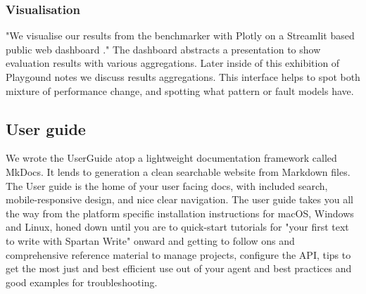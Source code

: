 \subsubsection{Visualisation}
"We visualise our results from the benchmarker with Plotly \cite{plotly} on a Streamlit based public web dashboard \cite{streamlit}."
The dashboard abstracts a presentation to show evaluation results with various aggregations.
Later inside of this exhibition of Playgound notes we discuss results aggregations.
This interface helps to spot both mixture of performance change, and spotting what pattern or fault models have.

\subsection{User guide}
We wrote the UserGuide atop a lightweight documentation framework called MkDocs.
It lends to generation a clean searchable website from Markdown files.
The User guide is the home of your user facing docs, with included search, mobile-responsive design, and nice clear navigation.
The user guide takes you all the way from the platform specific installation instructions for macOS, Windows and Linux, honed down until you are to quick-start tutorials for "your first text to write with Spartan Write" onward and getting to follow ons and comprehensive reference material to manage projects, configure the API, tips to get the most just and best efficient use out of your agent and best practices and good examples for troubleshooting.
